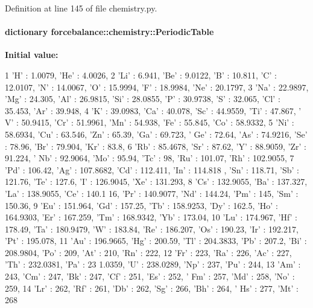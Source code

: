 \-Definition at line 145 of file chemistry.\-py.

\hypertarget{namespaceforcebalance_1_1chemistry_a10486086db3bcc2c63c591c726b3464f}{
\paragraph[{\-Periodic\-Table}]{\setlength{\rightskip}{0pt plus 5cm}dictionary {\bf forcebalance\-::chemistry\-::\-Periodic\-Table}}}\label{namespaceforcebalance_1_1chemistry_a10486086db3bcc2c63c591c726b3464f}
{\bfseries \-Initial value\-:}
\begin{DoxyCode}
1 {'H' : 1.0079, 'He' : 4.0026, 
2                  'Li' : 6.941, 'Be' : 9.0122, 'B' : 10.811, 'C' : 12.0107, 'N' 
      : 14.0067, 'O' : 15.9994, 'F' : 18.9984, 'Ne' : 20.1797,
3                  'Na' : 22.9897, 'Mg' : 24.305, 'Al' : 26.9815, 'Si' : 28.0855,
       'P' : 30.9738, 'S' : 32.065, 'Cl' : 35.453, 'Ar' : 39.948, 
4                  'K' : 39.0983, 'Ca' : 40.078, 'Sc' : 44.9559, 'Ti' : 47.867, '
      V' : 50.9415, 'Cr' : 51.9961, 'Mn' : 54.938, 'Fe' : 55.845, 'Co' : 58.9332, 
5                  'Ni' : 58.6934, 'Cu' : 63.546, 'Zn' : 65.39, 'Ga' : 69.723, '
      Ge' : 72.64, 'As' : 74.9216, 'Se' : 78.96, 'Br' : 79.904, 'Kr' : 83.8, 
6                  'Rb' : 85.4678, 'Sr' : 87.62, 'Y' : 88.9059, 'Zr' : 91.224, '
      Nb' : 92.9064, 'Mo' : 95.94, 'Tc' : 98, 'Ru' : 101.07, 'Rh' : 102.9055, 
7                  'Pd' : 106.42, 'Ag' : 107.8682, 'Cd' : 112.411, 'In' : 114.818
      , 'Sn' : 118.71, 'Sb' : 121.76, 'Te' : 127.6, 'I' : 126.9045, 'Xe' : 131.293, 
8                  'Cs' : 132.9055, 'Ba' : 137.327, 'La' : 138.9055, 'Ce' : 140.1
      16, 'Pr' : 140.9077, 'Nd' : 144.24, 'Pm' : 145, 'Sm' : 150.36, 
9                  'Eu' : 151.964, 'Gd' : 157.25, 'Tb' : 158.9253, 'Dy' : 162.5, 
      'Ho' : 164.9303, 'Er' : 167.259, 'Tm' : 168.9342, 'Yb' : 173.04, 
10                  'Lu' : 174.967, 'Hf' : 178.49, 'Ta' : 180.9479, 'W' : 183.84, 
      'Re' : 186.207, 'Os' : 190.23, 'Ir' : 192.217, 'Pt' : 195.078, 
11                  'Au' : 196.9665, 'Hg' : 200.59, 'Tl' : 204.3833, 'Pb' : 207.2,
       'Bi' : 208.9804, 'Po' : 209, 'At' : 210, 'Rn' : 222, 
12                  'Fr' : 223, 'Ra' : 226, 'Ac' : 227, 'Th' : 232.0381, 'Pa' : 23
      1.0359, 'U' : 238.0289, 'Np' : 237, 'Pu' : 244, 
13                  'Am' : 243, 'Cm' : 247, 'Bk' : 247, 'Cf' : 251, 'Es' : 252, '
      Fm' : 257, 'Md' : 258, 'No' : 259, 
14                  'Lr' : 262, 'Rf' : 261, 'Db' : 262, 'Sg' : 266, 'Bh' : 264, '
      Hs' : 277, 'Mt' : 268}
\end{DoxyCode}


